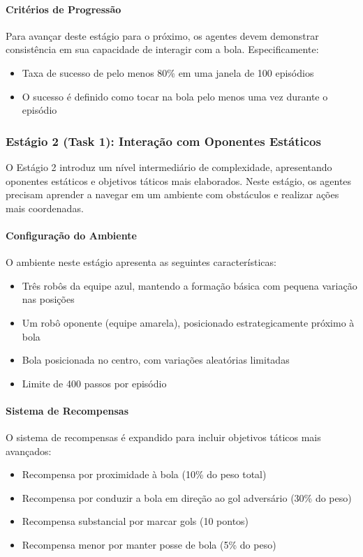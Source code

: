 \paragraph{Critérios de Progressão}

Para avançar deste estágio para o próximo, os agentes devem demonstrar consistência em sua capacidade de interagir com a bola. Especificamente:
\begin{itemize}
    \item Taxa de sucesso de pelo menos 80\% em uma janela de 100 episódios
    \item O sucesso é definido como tocar na bola pelo menos uma vez durante o episódio
\end{itemize}

\subsubsection{Estágio 2 (Task 1): Interação com Oponentes Estáticos}
\label{subsubsec:estagio2}

O Estágio 2 introduz um nível intermediário de complexidade, apresentando oponentes estáticos e objetivos táticos mais elaborados. Neste estágio, os agentes precisam aprender a navegar em um ambiente com obstáculos e realizar ações mais coordenadas.

\paragraph{Configuração do Ambiente}

O ambiente neste estágio apresenta as seguintes características:
\begin{itemize}
    \item Três robôs da equipe azul, mantendo a formação básica com pequena variação nas posições
    \item Um robô oponente (equipe amarela), posicionado estrategicamente próximo à bola
    \item Bola posicionada no centro, com variações aleatórias limitadas
    \item Limite de 400 passos por episódio
\end{itemize}

\paragraph{Sistema de Recompensas}

O sistema de recompensas é expandido para incluir objetivos táticos mais avançados:
\begin{itemize}
    \item Recompensa por proximidade à bola (10\% do peso total)
    \item Recompensa por conduzir a bola em direção ao gol adversário (30\% do peso)
    \item Recompensa substancial por marcar gols (10 pontos)
    \item Recompensa menor por manter posse de bola (5\% do peso)
\end{itemize}

